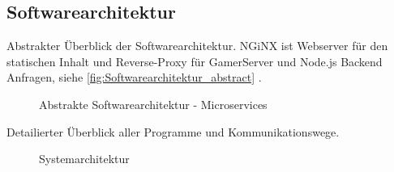 \documentclass[11pt,ngerman]{article}
\begin{document}
    \subsection{Softwarearchitektur}
    Abstrakter Überblick der Softwarearchitektur. \Gls{NGiNX} ist Webserver für den statischen Inhalt und \Gls{Reverse-Proxy} für GamerServer und Node.js Backend Anfragen, siehe \autoref{fig:Softwarearchitektur_abstract} .
        \begin{figure}[H]
        \centering
        \caption{Abstrakte Softwarearchitektur - \Glspl{Microservice}}
        \label{fig:Softwarearchitektur_abstract}
    \end{figure}
    \newpage
    Detailierter Überblick aller Programme und Kommunikationswege.
    \begin{figure}[H]
        \centering
        \caption{Systemarchitektur}
        \label{fig:Systemarchitecture}
    \end{figure}
\end{document}
